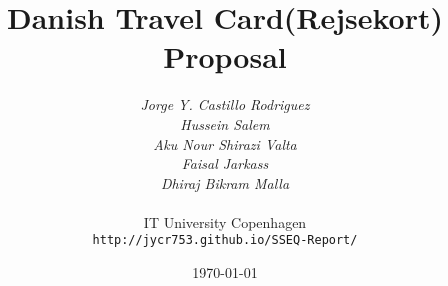 \documentclass[11pt,a4paper,oneside]{report}
\begin{document}
\title{Danish Travel Card(Rejsekort) Proposal}
\author{\textit{Jorge Y. Castillo Rodriguez}\\
  \textit{Hussein Salem}\\
  \textit{Aku Nour Shirazi Valta}\\
  \textit{Faisal Jarkass}\\
  \textit{Dhiraj Bikram Malla}\\
  \\
  IT University Copenhagen\\
  \texttt{http://jycr753.github.io/SSEQ-Report/}}
\date{\today}
\maketitle



\end{document}
